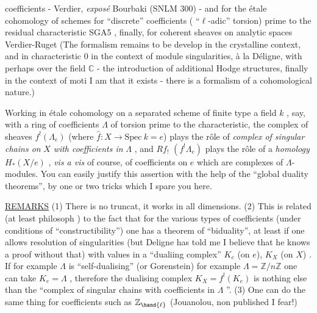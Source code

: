 
coefficients - Verdier, \emph{exposé} Bourbaki (SNLM 300) - and for the étale
cohomology of schemes for ``discrete'' coefficients ( ``$\ell$-adic''  torsion)
prime to the residual characteristic\over{-}{(} SGA5 \over{-}{)}, finally, for coherent sheaves
on analytic spaces \over{-}{(} Verdier-Ruget\over{-}{)} (The formalism remains to be develop
in the crystalline context, and in characteristic $0$ in the context of
 module   singularities, à la Déligne, with perhaps \deleted{-}
\hand{-} over the field $\mathbb{C}$ - the introduction of additional Hodge structures, finally
in the context of moti I am   that it exists  
-   there is a formalism of a cohomological
nature.)

Working in étale cohomology on a separated scheme of finite type  a
field $k$ , say, with a ring of coefficients $\Lambda$ of torsion prime to the
characteristic, the complex of sheaves $f^{!}(\Lambda_e)$ (where $\hat{f} : X \to \mathrm{Spec}\ k = e$)
plays the rôle of \emph{complex of singular chains on} $X$ \emph{with coefficients in} $\Lambda$ ,
and $Rf_{!}$ $(f^{!}\Lambda_e)$ plays the rôle of a \emph{homology} $H_{*}(X/e)$ , \emph{vis a vis} of course,
of coefficients on $e$ which are complexes of $\Lambda$-modules. You can easily
justify this assertion with the help of the ``global duality theorems'', by
one or two tricks which I spare you here.

\uline{REMARKS} (1) There is no  truncat, it works in all dimensions.
(2) This is related (at least   philosoph  ) to the
fact that for the various types of coefficients (under conditions of
``constructibility'') one has a theorem of ``biduality'', at least if one allows
resolution of singularities (but Deligne has told me I believe that he knows
a proof without that)\hand{,} with values in a ``dualiing complex'' $K_e$ (on $e$),
$K_X$ (on $X$) . If for example $\Lambda$ is ``self-dualising'' (or Gorenstein) for
example $\Lambda = \mathbb{Z}/n\mathbb{Z}$\hand{,} one can take $K_e = \Lambda$ , therefore the dualising complex
$K_X = f^{!}(K_e)$ is nothing else than the ``complex of singular chains with
coefficients in $\Lambda$ ''.
(3) One can do the same thing for coefficients such as $\mathbb{Z}_{\hand{\ell}}$ (Jouanolou, 
non published \hand{,} I fear!)

